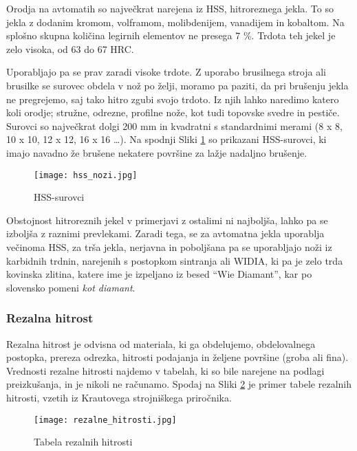 Orodja na avtomatih so največkrat narejena iz HSS,
hitroreznega jekla. To so jekla z dodanim kromom, volframom,
molibdenijem, vanadijem in kobaltom. Na splošno skupna količina
legirnih elementov ne presega 7 \%. Trdota teh jekel je zelo visoka,
od 63 do 67 HRC.

Uporabljajo pa se prav zaradi visoke trdote. Z uporabo
brusilnega stroja ali brusilke se surovec obdela v nož po želji,
moramo pa paziti, da pri brušenju jekla ne pregrejemo, saj tako
hitro zgubi svojo trdoto.
Iz njih lahko naredimo katero koli orodje; stružne, odrezne,
profilne nože, kot tudi topovske svedre in pestiče. Surovci so
največkrat dolgi 200 mm in kvadratni s standardnimi merami
(8 x 8, 10 x 10, 12 x 12, 16 x 16 …). Na spodnji Sliki \ref{hss_nozi}
so prikazani HSS-surovci, ki imajo navadno že brušene
nekatere površine za lažje nadaljno brušenje.

\begin{figure}[H]
	\begin{center}
		\texttt{[image: hss\_nozi.jpg]}
		\caption{HSS-surovci
			\cite{hss_nozi}}
		\label{hss_nozi}
	\end{center}
\end{figure}

Obstojnost hitroreznih jekel v primerjavi z ostalimi ni najboljša,
lahko pa se izboljša z raznimi prevlekami. Zaradi tega, se za
avtomatna jekla uporablja večinoma HSS, za trša jekla, nerjavna
in poboljšana pa se uporabljajo noži iz karbidnih trdnin,
narejenih s postopkom sintranja ali WIDIA, ki pa je zelo trda
kovinska zlitina, katere ime je izpeljano iz besed \enquote{Wie Diamant},
kar po slovensko pomeni \textit{kot diamant}.

\subsubsection{Rezalna hitrost}
Rezalna hitrost je odvisna od materiala, ki ga obdelujemo,
obdelovalnega postopka, prereza odrezka, hitrosti podajanja
in željene površine (groba ali fina). Vrednosti rezalne hitrosti
najdemo v tabelah, ki so bile narejene na podlagi preizkušanja,
in je nikoli ne računamo. Spodaj na Sliki \ref{rezalna_hitrost}
je primer tabele rezalnih hitrosti, vzetih iz Krautovega strojniškega
priročnika.

\begin{figure}[H]
	\begin{center}
		\texttt{[image: rezalne\_hitrosti.jpg]}
		\caption{Tabela rezalnih hitrosti
			\cite{strojniski_prirocnik}}
		\label{rezalna_hitrost}
	\end{center}
\end{figure}

